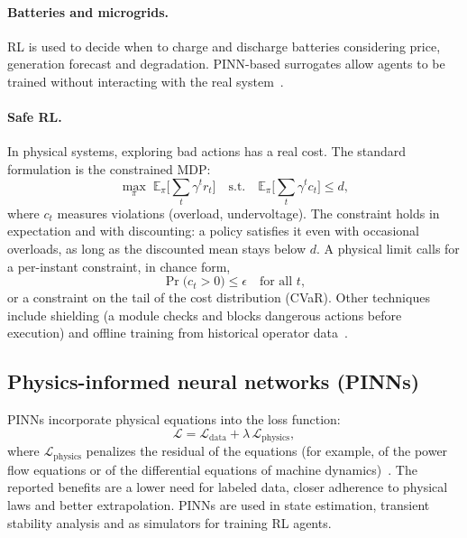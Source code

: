\documentclass[10pt,a4paper,oneside]{article}
\begin{document}
\paragraph{Batteries and microgrids.} RL is used to decide when to charge
and discharge batteries considering price, generation forecast and
degradation. PINN-based surrogates allow agents to be trained without
interacting with the real system~\cite{rlpinn}.

\paragraph{Safe RL.} In physical systems, exploring bad actions has a real
cost. The standard formulation is the constrained MDP:
\begin{equation}
  \max_\pi \; \mathbb{E}_\pi\Big[\sum_t \gamma^t r_t\Big]
  \quad \text{s.t.} \quad
  \mathbb{E}_\pi\Big[\sum_t \gamma^t c_t\Big] \le d,
\end{equation}
where $c_t$ measures violations (overload, undervoltage). The constraint
holds in expectation and with discounting: a policy satisfies it even with
occasional overloads, as long as the discounted mean stays below $d$. A
physical limit calls for a per-instant constraint, in chance form,
\begin{equation}
  \Pr\big(c_t > 0\big) \le \epsilon \quad \text{for all } t,
\end{equation}
or a constraint on the tail of the cost distribution (CVaR). Other
techniques include shielding (a module checks and blocks dangerous actions
before execution) and offline training from historical operator
data~\cite{saferl}.

\subsection{Physics-informed neural networks (PINNs)}

PINNs incorporate physical equations into the loss function:
\begin{equation}
  \mathcal{L} = \mathcal{L}_{\text{data}} + \lambda\, \mathcal{L}_{\text{physics}},
\end{equation}
where $\mathcal{L}_{\text{physics}}$ penalizes the residual of the equations
(for example, of the power flow equations or of the differential equations
of machine dynamics)~\cite{pinn}. The reported benefits are a lower need for
labeled data, closer adherence to physical laws and better extrapolation.
PINNs are used in state estimation, transient stability analysis and as
simulators for training RL agents.
\end{document}
